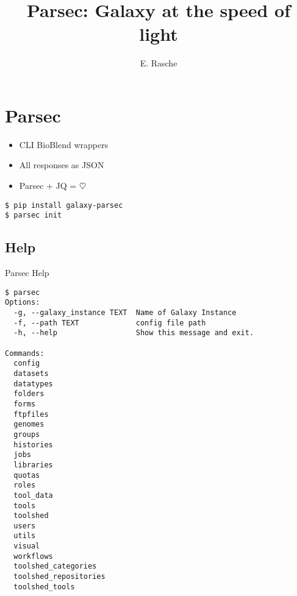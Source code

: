 \documentclass[12pt]{phage3slides} %
\title[Parsec]{Parsec: Galaxy at the speed of light}
\author[erasche]{E. Rasche}
\begin{document}
\frame{\titlepage}


\section{Parsec}
\begin{frame}[fragile]
	\begin{itemize}
		\item CLI BioBlend wrappers
		\item All responses as JSON
		\item Parsec + JQ = $\heartsuit$
	\end{itemize}
\begin{verbatim}
$ pip install galaxy-parsec
$ parsec init
\end{verbatim}
\end{frame}


\subsection{Help}
\begin{frame}[fragile]{Parsec Help}

\begin{verbatim}
$ parsec
Options:
  -g, --galaxy_instance TEXT  Name of Galaxy Instance
  -f, --path TEXT             config file path
  -h, --help                  Show this message and exit.

Commands:
  config
  datasets
  datatypes
  folders
  forms
  ftpfiles
  genomes
  groups
  histories
  jobs
  libraries
  quotas
  roles
  tool_data
  tools
  toolshed
  users
  utils
  visual
  workflows
  toolshed_categories
  toolshed_repositories
  toolshed_tools
\end{verbatim}
\end{frame}
\end{document}
